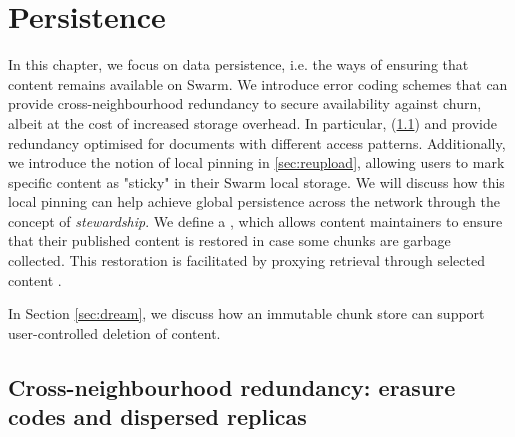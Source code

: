 \chapter{Persistence \statusgreen}\label{sec:persistence}


In this chapter, we focus on data persistence, i.e. the ways of ensuring that content remains available on Swarm. 
We introduce error coding schemes that can provide cross-neighbourhood redundancy to secure availability against churn, albeit at the cost of increased storage overhead. 
In particular,  (\ref{sec:erasure}) and   %
provide redundancy optimised for documents with different access patterns.
Additionally, we introduce the notion of local pinning in \ref{sec:reupload}, allowing users to mark specific content as "sticky" in their Swarm local storage. We will discuss how this local pinning can help achieve global persistence across the network through the concept of \emph{stewardship}. We define a , which allows content maintainers to ensure that their published content is restored in case some chunks are garbage collected. This restoration is facilitated by proxying retrieval through selected content .

In Section \ref{sec:dream}, we discuss how an immutable chunk store can support user-controlled deletion of content.





\section{Cross-neighbourhood redundancy: erasure codes and dispersed replicas \statusgreen}\label{sec:erasure}
\green{}

